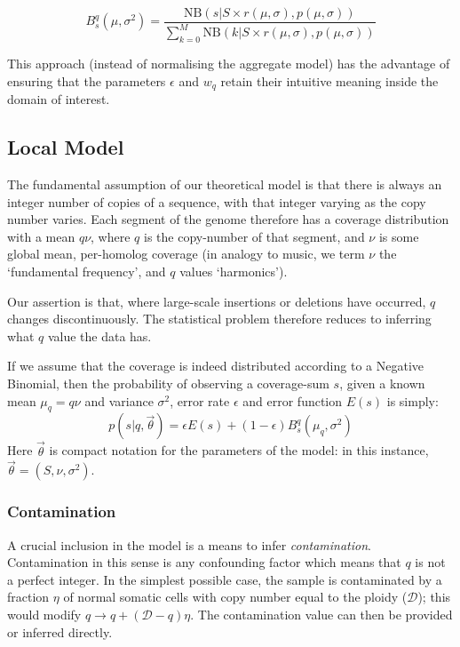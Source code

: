 \documentclass[fleqn,usenatbib]{mnras}
\begin{document}
{{						\begin{equation}
							B_s^q (\mu,\sigma^2) = \frac{\text{NB}(s | S\times r(\mu,\sigma), p(\mu,\sigma))}{\sum_{k=0}^M \text{NB}(k| S\times r(\mu,\sigma), p(\mu,\sigma))}
						\end{equation}

						This approach (instead of normalising the aggregate model) has the advantage of ensuring that the parameters $\epsilon$ and $w_q$ retain their intuitive meaning inside the domain of interest. 
				\subsection{Local Model}\label{A:Model}
					
					The fundamental assumption of our theoretical model is that there is always an integer number of copies of a sequence, with that integer varying as the copy number varies. Each segment of the genome therefore has a coverage distribution with a mean $q \nu$, where $q$ is the copy-number of that segment, and $\nu$ is some global mean, per-homolog coverage (in analogy to music, we term $\nu$ the `fundamental frequency', and $q$ values `harmonics').
					
					Our assertion is that, where large-scale insertions or deletions have occurred, $q$ changes discontinuously. The statistical problem therefore reduces to inferring what $q$ value the data has. 
					
					If we assume that the coverage is indeed distributed according to a Negative Binomial, then the probability of observing a coverage-sum $s$, given a known mean $\mu_q = q\nu$ and variance $\sigma^2$, error rate $\epsilon$ and error function $E(s)$ is simply:
					\begin{equation}
						p(s | q, \vec{\theta}) = \epsilon E(s) + (1 - \epsilon) B_s^q (\mu_q, \sigma^2) \label{E:MixtureModel}
					\end{equation} 
					Here $\vec{\theta}$ is compact notation for the parameters of the model: in this instance, $\vec{\theta} = (S,\nu,\sigma^2)$.
					\subsubsection{Contamination}

						A crucial inclusion in the model is a means to infer \textit{contamination}. Contamination in this sense is any confounding factor which means that $q$ is not a perfect integer. In the simplest possible case, the sample is contaminated by a fraction $\eta$ of normal somatic cells with copy number equal to the ploidy ($\mathcal{D}$); this would modify $q \to q + (\mathcal{D} - q) \eta$. The contamination value can then be provided or inferred directly.

}}
\end{document}
